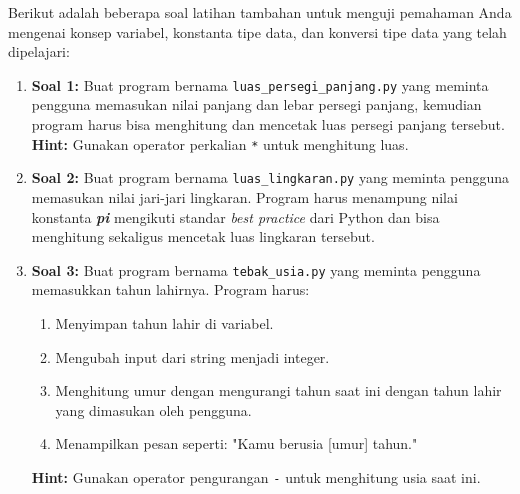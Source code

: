 Berikut adalah beberapa soal latihan tambahan untuk menguji pemahaman Anda mengenai konsep variabel, konstanta tipe data, dan konversi tipe data yang telah dipelajari:
\begin{enumerate}
\item \textbf{Soal 1:} Buat program bernama \texttt{luas_persegi_panjang.py} yang meminta pengguna memasukan nilai panjang dan lebar persegi panjang, kemudian program harus bisa menghitung dan mencetak luas persegi panjang tersebut.
\newline \newline
\textbf{Hint:} Gunakan operator perkalian \texttt{*} untuk menghitung luas.

\item \textbf{Soal 2:} Buat program bernama \texttt{luas_lingkaran.py} yang meminta pengguna memasukan nilai jari-jari lingkaran. Program harus menampung nilai konstanta \textbf{\textit{pi}} mengikuti standar \textit{best practice} dari Python dan bisa menghitung sekaligus mencetak luas lingkaran tersebut.

\item \textbf{Soal 3:} Buat program bernama \texttt{tebak_usia.py} yang meminta pengguna memasukkan tahun lahirnya. Program harus:
\begin{enumerate}
    \item Menyimpan tahun lahir di variabel.
    \item Mengubah input dari string menjadi integer.
    \item Menghitung umur dengan mengurangi tahun saat ini dengan tahun lahir yang dimasukan oleh pengguna.
    \item Menampilkan pesan seperti: "Kamu berusia [umur] tahun."
\end{enumerate}

\textbf{Hint:} Gunakan operator pengurangan \texttt{-} untuk menghitung usia saat ini.

\end{enumerate}